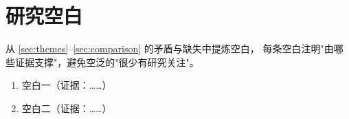 \section{研究空白}
\label{sec:gaps}

从 \ref{sec:themes}--\ref{sec:comparison} 的矛盾与缺失中提炼空白，
每条空白注明"由哪些证据支撑"，避免空泛的"很少有研究关注"。

\begin{enumerate}
  \item 空白一（证据：……）
  \item 空白二（证据：……）
\end{enumerate}
